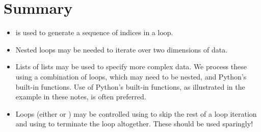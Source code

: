 \documentclass[letterpaper,10pt,english]{sphinxmanual}
\begin{document}
\section{Summary}
\label{\detokenize{lecture_notes/lec12_loops2_for_double:summary}}\begin{itemize}
\item {} 
 is used to generate a sequence of indices in a 
loop.

\item {} 
Nested  loops may be needed to iterate over two dimensions of
data.

\item {} 
Lists of lists may be used to specify more complex data.  We process
these using a combination of  loops, which may need to be
nested, and Python’s built-in functions.  Use of Python’s built-in
functions, as illustrated in the example in these notes, is
often preferred.

\item {} 
Loops (either  or ) may be controlled using  to
skip the rest of a loop iteration and using  to terminate
the loop altogether.  These should be used sparingly!

\end{itemize}
\end{document}
